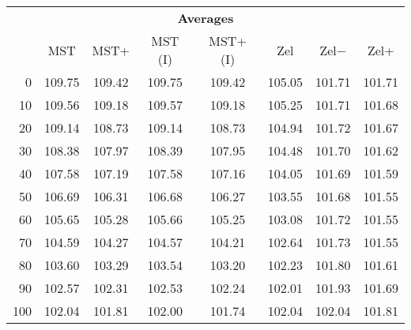 \begin{tabular}{r|ccccccc}
      \multicolumn{8}{c}{{\bf Averages }} \\
      & MST & MST+ & MST (I) & MST+ (I) & Zel & Zel$-$ & Zel+ \\ \hline\hline
0
& 109.75
& 109.42
& 109.75
& 109.42
& 105.05
& 101.71
& 101.71
\\
10
& 109.56
& 109.18
& 109.57
& 109.18
& 105.25
& 101.71
& 101.68
\\
20
& 109.14
& 108.73
& 109.14
& 108.73
& 104.94
& 101.72
& 101.67
\\
30
& 108.38
& 107.97
& 108.39
& 107.95
& 104.48
& 101.70
& 101.62
\\
40
& 107.58
& 107.19
& 107.58
& 107.16
& 104.05
& 101.69
& 101.59
\\
50
& 106.69
& 106.31
& 106.68
& 106.27
& 103.55
& 101.68
& 101.55
\\
60
& 105.65
& 105.28
& 105.66
& 105.25
& 103.08
& 101.72
& 101.55
\\
70
& 104.59
& 104.27
& 104.57
& 104.21
& 102.64
& 101.73
& 101.55
\\
80
& 103.60
& 103.29
& 103.54
& 103.20
& 102.23
& 101.80
& 101.61
\\
90
& 102.57
& 102.31
& 102.53
& 102.24
& 102.01
& 101.93
& 101.69
\\
100
& 102.04
& 101.81
& 102.00
& 101.74
& 102.04
& 102.04
& 101.81
\\
\end{tabular}

